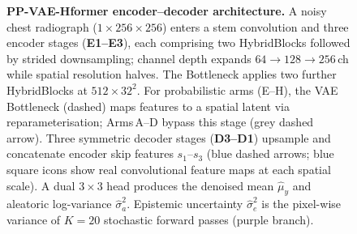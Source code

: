\begin{figure}[htbp]
\centering
\resizebox{0.82\textwidth}{!}{}
\caption[PP-VAE-Hformer overall architecture]{%
  \textbf{PP-VAE-Hformer encoder--decoder architecture.}
  A noisy chest radiograph ($1{\times}256{\times}256$) enters a stem convolution
  and three encoder stages (\textbf{E1--E3}), each comprising two HybridBlocks
  followed by strided downsampling; channel depth expands
  $64\!\to\!128\!\to\!256$\,ch while spatial resolution halves.
  The Bottleneck applies two further HybridBlocks at $512{\times}32^2$.
  For probabilistic arms (E--H), the VAE Bottleneck (dashed) maps features to
  a spatial latent via reparameterisation; Arms\,A--D bypass this stage (grey
  dashed arrow).
  Three symmetric decoder stages (\textbf{D3--D1}) upsample and concatenate
  encoder skip features $s_1$--$s_3$ (blue dashed arrows; blue square icons show
  real convolutional feature maps at each spatial scale).
  A dual $3{\times}3$ head produces the denoised mean $\hat{\mu}_y$ and
  aleatoric log-variance $\hat{\sigma}^2_a$.
  Epistemic uncertainty $\hat{\sigma}^2_e$ is the pixel-wise variance of
  $K{=}20$ stochastic forward passes (purple branch).}
\label{fig:arch:overview}
\end{figure}
